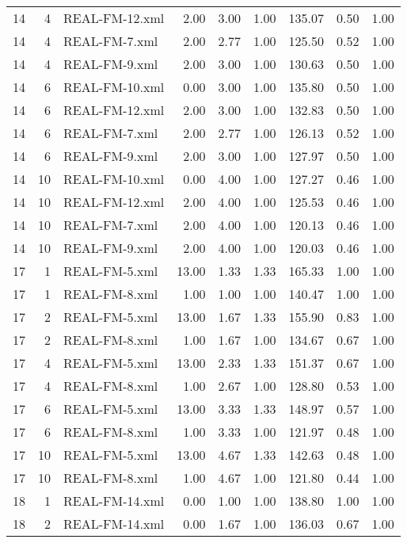 \begin{table}[ht]
\begin{tabular}{rrlrrrrrr}
   14 &   4 & REAL-FM-12.xml & 2.00 & 3.00 & 1.00 & 135.07 & 0.50 & 1.00 \\ 
   14 &   4 & REAL-FM-7.xml & 2.00 & 2.77 & 1.00 & 125.50 & 0.52 & 1.00 \\ 
   14 &   4 & REAL-FM-9.xml & 2.00 & 3.00 & 1.00 & 130.63 & 0.50 & 1.00 \\ 
   14 &   6 & REAL-FM-10.xml & 0.00 & 3.00 & 1.00 & 135.80 & 0.50 & 1.00 \\ 
   14 &   6 & REAL-FM-12.xml & 2.00 & 3.00 & 1.00 & 132.83 & 0.50 & 1.00 \\ 
   14 &   6 & REAL-FM-7.xml & 2.00 & 2.77 & 1.00 & 126.13 & 0.52 & 1.00 \\ 
   14 &   6 & REAL-FM-9.xml & 2.00 & 3.00 & 1.00 & 127.97 & 0.50 & 1.00 \\ 
   14 &  10 & REAL-FM-10.xml & 0.00 & 4.00 & 1.00 & 127.27 & 0.46 & 1.00 \\ 
   14 &  10 & REAL-FM-12.xml & 2.00 & 4.00 & 1.00 & 125.53 & 0.46 & 1.00 \\ 
   14 &  10 & REAL-FM-7.xml & 2.00 & 4.00 & 1.00 & 120.13 & 0.46 & 1.00 \\ 
   14 &  10 & REAL-FM-9.xml & 2.00 & 4.00 & 1.00 & 120.03 & 0.46 & 1.00 \\ 
   17 &   1 & REAL-FM-5.xml & 13.00 & 1.33 & 1.33 & 165.33 & 1.00 & 1.00 \\ 
   17 &   1 & REAL-FM-8.xml & 1.00 & 1.00 & 1.00 & 140.47 & 1.00 & 1.00 \\ 
   17 &   2 & REAL-FM-5.xml & 13.00 & 1.67 & 1.33 & 155.90 & 0.83 & 1.00 \\ 
   17 &   2 & REAL-FM-8.xml & 1.00 & 1.67 & 1.00 & 134.67 & 0.67 & 1.00 \\ 
   17 &   4 & REAL-FM-5.xml & 13.00 & 2.33 & 1.33 & 151.37 & 0.67 & 1.00 \\ 
   17 &   4 & REAL-FM-8.xml & 1.00 & 2.67 & 1.00 & 128.80 & 0.53 & 1.00 \\ 
   17 &   6 & REAL-FM-5.xml & 13.00 & 3.33 & 1.33 & 148.97 & 0.57 & 1.00 \\ 
   17 &   6 & REAL-FM-8.xml & 1.00 & 3.33 & 1.00 & 121.97 & 0.48 & 1.00 \\ 
   17 &  10 & REAL-FM-5.xml & 13.00 & 4.67 & 1.33 & 142.63 & 0.48 & 1.00 \\ 
   17 &  10 & REAL-FM-8.xml & 1.00 & 4.67 & 1.00 & 121.80 & 0.44 & 1.00 \\ 
   18 &   1 & REAL-FM-14.xml & 0.00 & 1.00 & 1.00 & 138.80 & 1.00 & 1.00 \\ 
   18 &   2 & REAL-FM-14.xml & 0.00 & 1.67 & 1.00 & 136.03 & 0.67 & 1.00 \\ 

\end{tabular}
\end{table}
